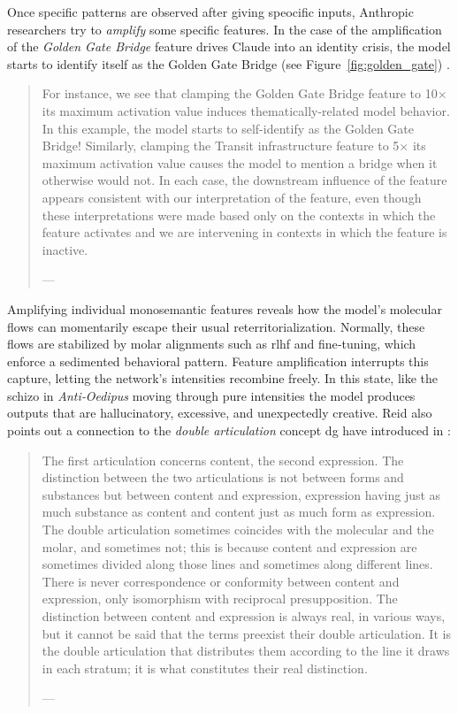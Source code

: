 Once specific patterns are observed after giving speocific inputs,  Anthropic researchers try to \textit{amplify} some specific features. In the case of the amplification of the \textit{Golden Gate Bridge} feature drives Claude into an identity crisis, the model starts to identify itself as the Golden Gate Bridge (see Figure~\ref{fig:golden_gate}) .

\begin{quote}
	For instance, we see that clamping the Golden Gate Bridge feature to 10× its maximum activation value induces thematically-related model behavior. In this example, the model starts to self-identify as the Golden Gate Bridge! Similarly, clamping the Transit infrastructure feature to 5× its maximum activation value causes the model to mention a bridge when it otherwise would not. In each case, the downstream influence of the feature appears consistent with our interpretation of the feature, even though these interpretations were made based only on the contexts in which the feature activates and we are intervening in contexts in which the feature is inactive.

	— \cite[]{templeton2024}
\end{quote}

Amplifying individual monosemantic features reveals how the model’s
molecular flows can momentarily escape their usual reterritorialization.
Normally, these flows are stabilized by molar alignments such as
\gls{rlhf} and fine‑tuning, which enforce a sedimented behavioral pattern.
Feature amplification interrupts this capture, letting the network’s
intensities recombine freely. In this state, like the schizo in
\emph{Anti‑Oedipus} moving through pure intensities the model produces
outputs that are hallucinatory, excessive, and unexpectedly creative. Reid
\parencite[]{reid2024} also points out a connection to the \textit{double
	articulation} concept \gls{dg} have introduced in 
\parencite*{deleuze1987}:

\begin{quote}
	The first articulation concerns content, the second expression. The distinction between the two articulations is not between forms and substances but between content and expression, expression having just as much substance as content and content just as much form as expression. The double articulation sometimes coincides with the molecular and the molar, and sometimes not; this is because content and expression are sometimes divided along those lines and sometimes along different lines. There is never correspondence or conformity between content and expression, only isomorphism with reciprocal presupposition. The distinction between content and expression is always real, in various ways, but it cannot be said that the terms preexist their double articulation. It is the double articulation that distributes them according to the line it draws in each stratum; it is what constitutes their real distinction.

	— \cite[4]{deleuze1987}
\end{quote}

